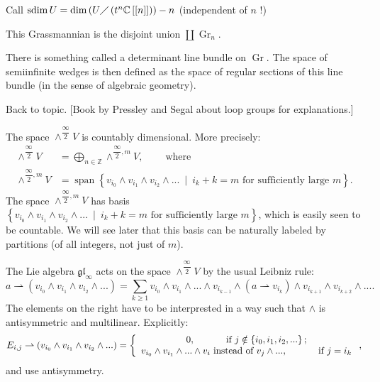 \documentclass
[numbers=enddot,12pt,final,onecolumn,german,notitlepage]{scrartcl}%
\theoremstyle{definition}
\begin{document}
Call $\operatorname*{sdim}U=\dim\left(  U\diagup\left(  t^{n}\mathbb{C}\left[
\left[  n\right]  \right]  \right)  \right)  -n$ (independent of $n$ !)

This Grassmannian is the disjoint union $\coprod\operatorname*{Gr}%
\nolimits_{n}$.

There is something called a determinant line bundle on $\operatorname*{Gr}$.
The space of semiinfinite wedges is then defined as the space of regular
sections of this line bundle (in the sense of algebraic geometry).

Back to topic. [Book by Pressley and Segal about loop groups for explanations.]

The space $\wedge^{\dfrac{\infty}{2}}V$ is countably dimensional. More
precisely:%
\begin{align*}
\wedge^{\dfrac{\infty}{2}}V  &  =\bigoplus\limits_{n\in\mathbb{Z}}%
\wedge^{\dfrac{\infty}{2},m}V,\ \ \ \ \ \ \ \ \ \ \text{where}\\
\wedge^{\dfrac{\infty}{2},m}V  &  =\operatorname*{span}\left\{  v_{i_{0}%
}\wedge v_{i_{1}}\wedge v_{i_{2}}\wedge...\ \mid\ i_{k}+k=m\text{ for
sufficiently large }m\right\}  .
\end{align*}
The space $\wedge^{\dfrac{\infty}{2},m}V$ has basis $\left\{  v_{i_{0}}\wedge
v_{i_{1}}\wedge v_{i_{2}}\wedge...\ \mid\ i_{k}+k=m\text{ for sufficiently
large }m\right\}  $, which is easily seen to be countable. We will see later
that this basis can be naturally labeled by partitions (of all integers, not
just of $m$).

The Lie algebra $\mathfrak{gl}_{\infty}$ acts on the space $\wedge
^{\dfrac{\infty}{2}}V$ by the usual Leibniz rule:%
\[
a\rightharpoonup\left(  v_{i_{0}}\wedge v_{i_{1}}\wedge v_{i_{2}}%
\wedge...\right)  =\sum\limits_{k\geq1}v_{i_{0}}\wedge v_{i_{1}}%
\wedge...\wedge v_{i_{k-1}}\wedge\left(  a\rightharpoonup v_{i_{k}}\right)
\wedge v_{i_{k+1}}\wedge v_{i_{k+2}}\wedge....
\]
The elements on the right have to be interprested in a way such that $\wedge$
is antisymmetric and multilinear. Explicitly:%
\[
E_{i,j}\rightharpoonup\left(  v_{i_{0}}\wedge v_{i_{1}}\wedge v_{i_{2}}%
\wedge...\right)  =\left\{
\begin{array}
[c]{c}%
0,\ \ \ \ \ \ \ \ \ \ \text{if }j\notin\left\{  i_{0},i_{1},i_{2},...\right\}
;\\
v_{i_{0}}\wedge v_{i_{1}}\wedge...\wedge v_{i}\text{ instead of }v_{j}%
\wedge...,\ \ \ \ \ \ \ \ \ \ \text{if }j=i_{k}%
\end{array}
\right.  ,
\]
and use antisymmetry.
\end{document}
